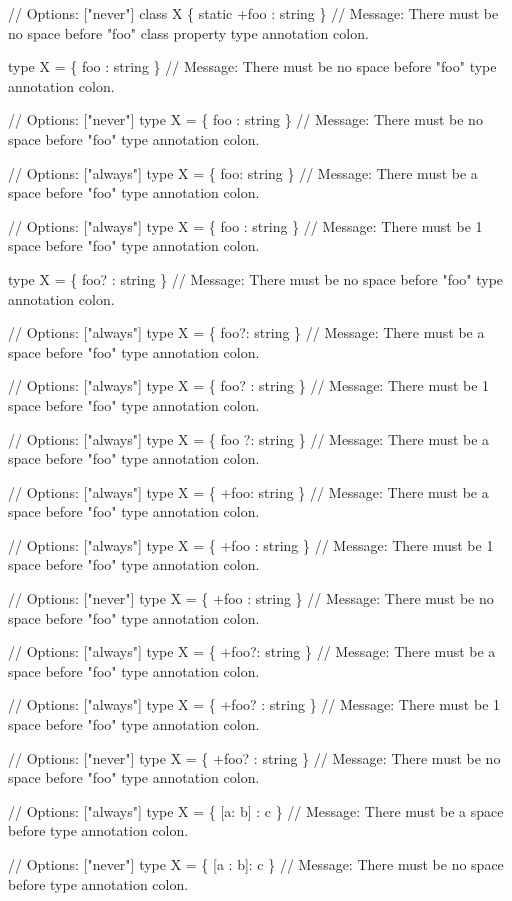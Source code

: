 \begin{DoxyCode}
// Options: ["never"]
class X \{ static +foo : string \}
// Message: There must be no space before "foo" class property type annotation colon.

type X = \{ foo : string \}
// Message: There must be no space before "foo" type annotation colon.

// Options: ["never"]
type X = \{ foo : string \}
// Message: There must be no space before "foo" type annotation colon.

// Options: ["always"]
type X = \{ foo: string \}
// Message: There must be a space before "foo" type annotation colon.

// Options: ["always"]
type X = \{ foo  : string \}
// Message: There must be 1 space before "foo" type annotation colon.

type X = \{ foo? : string \}
// Message: There must be no space before "foo" type annotation colon.

// Options: ["always"]
type X = \{ foo?: string \}
// Message: There must be a space before "foo" type annotation colon.

// Options: ["always"]
type X = \{ foo?  : string \}
// Message: There must be 1 space before "foo" type annotation colon.

// Options: ["always"]
type X = \{ foo   ?: string \}
// Message: There must be a space before "foo" type annotation colon.

// Options: ["always"]
type X = \{ +foo: string \}
// Message: There must be a space before "foo" type annotation colon.

// Options: ["always"]
type X = \{ +foo  : string \}
// Message: There must be 1 space before "foo" type annotation colon.

// Options: ["never"]
type X = \{ +foo : string \}
// Message: There must be no space before "foo" type annotation colon.

// Options: ["always"]
type X = \{ +foo?: string \}
// Message: There must be a space before "foo" type annotation colon.

// Options: ["always"]
type X = \{ +foo?  : string \}
// Message: There must be 1 space before "foo" type annotation colon.

// Options: ["never"]
type X = \{ +foo? : string \}
// Message: There must be no space before "foo" type annotation colon.

// Options: ["always"]
type X = \{ [a: b] : c \}
// Message: There must be a space before type annotation colon.

// Options: ["never"]
type X = \{ [a : b]: c \}
// Message: There must be no space before type annotation colon.


\end{DoxyCode}
